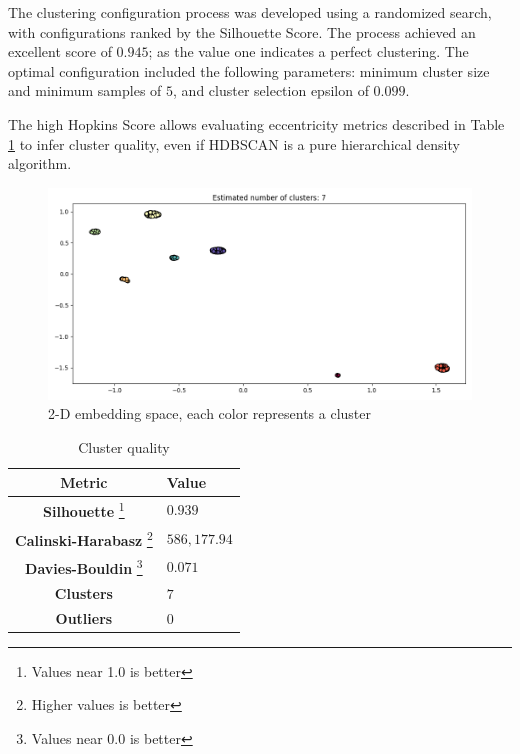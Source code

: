 \documentclass[12pt]{article}
\begin{document}
The clustering configuration process was developed using a randomized search, with configurations ranked by the Silhouette Score. The process achieved an excellent score of $0.945$; as the value one indicates a perfect clustering. The optimal configuration included the following parameters: minimum cluster size and minimum samples of $5$, and cluster selection epsilon of $0.099$.

The high Hopkins Score allows evaluating eccentricity metrics described in Table \ref{tab:clresult} to infer cluster quality, even if HDBSCAN is a pure hierarchical density algorithm.

\begin{figure}[ht]
\includegraphics[width=15cm]{cluster.png}
\centering
 \caption{2-D embedding space, each color represents a cluster}
    \label{fig:cluster}
\end{figure}

 

\begin{table}[ht]
\begin{minipage}{\textwidth}
\centering
\vspace{3mm}
\begin{tabular}{cl}
\textbf{Metric} & \textbf{Value} \\
\hline
\textbf{Silhouette} \footnote{Values near 1.0 is better} & $0.939$ \\ 
\textbf{Calinski-Harabasz} \footnote{Higher values is better} & $586,177.94$ \\ 
\textbf{Davies-Bouldin} \footnote{Values near 0.0 is better} & $0.071$ \\ 
\textbf{Clusters} & $7$ \\
\textbf{Outliers} & $0$ \\
\hline
\hline
\end{tabular}
\caption{Cluster quality}
\label{tab:clresult}
\end{minipage}
\end{table}
\end{document}
